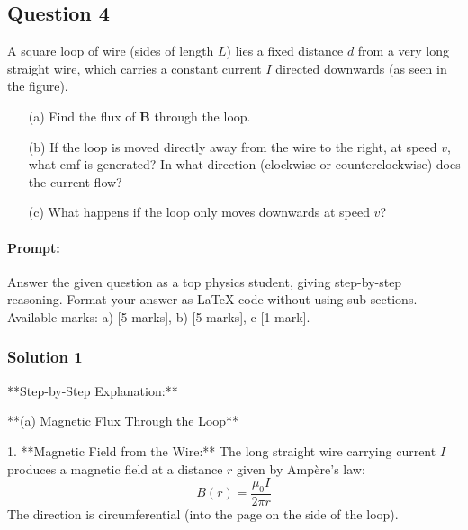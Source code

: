 \documentclass{article}
\begin{document}
\subsection{Question 4}
A square loop of wire (sides of length $L$) lies a fixed distance $d$ from a very long straight wire, which carries a constant current $I$ directed downwards (as seen in the figure).

\begin{enumerate}
    \item[(a)] Find the flux of $\mathbf{B}$ through the loop.
    \item[(b)] If the loop is moved directly away from the wire to the right, at speed $v$, what emf is generated? In what direction (clockwise or counterclockwise) does the current flow?
    \item[(c)] What happens if the loop only moves downwards at speed $v$?
\end{enumerate}


\paragraph{Prompt: \\} 
Answer the given question as a top physics student, giving step-by-step reasoning. Format your answer as LaTeX code without using sub-sections. Available marks: a) [5 marks], b) [5 marks], c [1 mark].

\subsubsection{Solution 1}

**Step-by-Step Explanation:**

**(a) Magnetic Flux Through the Loop**

1. **Magnetic Field from the Wire:**  
   The long straight wire carrying current \( I \) produces a magnetic field at a distance \( r \) given by Ampère's law:
   \[
   B(r) = \frac{\mu_0 I}{2\pi r}
   \]
   The direction is circumferential (into the page on the side of the loop).
\end{document}
